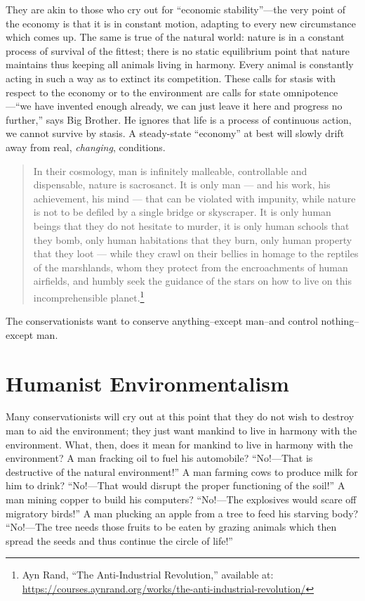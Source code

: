 \documentclass[11pt]{article}
\begin{document}
They are akin to those who cry out for ``economic stability''---the very point of the economy is that it is in constant motion, adapting to every new circumstance which comes up. The same is true of the natural world: nature is in a constant process of survival of the fittest; there is no static equilibrium point that nature maintains thus keeping all animals living in harmony. Every animal is constantly acting in such a way as to extinct its competition. These calls for stasis with respect to the economy or to the environment are calls for state omnipotence---``we have invented enough already, we can just leave it here and progress no further,'' says Big Brother. He ignores that life is a process of continuous action, we cannot survive by stasis. A steady-state ``economy'' at best will slowly drift away from real, \emph{changing}, conditions.

\begin{quote}
In their cosmology, man is infinitely malleable, controllable and dispensable, nature is sacrosanct. It is only man --- and his work, his achievement, his mind --- that can be violated with impunity, while nature is not to be defiled by a single bridge or skyscraper. It is only human beings that they do not hesitate to murder, it is only human schools that they bomb, only human habitations that they burn, only human property that they loot --- while they crawl on their bellies in homage to the reptiles of the marshlands, whom they protect from the encroachments of human airfields, and humbly seek the guidance of the stars on how to live on this incomprehensible planet.\footnote{Ayn Rand, ``The Anti-Industrial Revolution,'' available at: \url{https://courses.aynrand.org/works/the-anti-industrial-revolution/}}
\end{quote}

The conservationists want to conserve anything--except man--and control nothing--except man.

\section{Humanist Environmentalism}
\label{sec:org683dc26}
Many conservationists will cry out at this point that they do not wish to destroy man to aid the environment; they just want mankind to live in harmony with the environment. What, then, does it mean for mankind to live in harmony with the environment? A man fracking oil to fuel his automobile? ``No!---That is destructive of the natural environment!'' A man farming cows to produce milk for him to drink? ``No!---That would disrupt the proper functioning of the soil!'' A man mining copper to build his computers? ``No!---The explosives would scare off migratory birds!'' A man plucking an apple from a tree to feed his starving body? ``No!---The tree needs those fruits to be eaten by grazing animals which then spread the seeds and thus continue the circle of life!''
\end{document}
